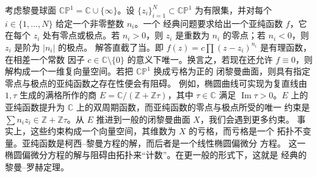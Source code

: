 \documentclass[11pt]{amsart}
\theoremstyle{definition}
\theoremstyle{remark}
\theoremstyle{plain}
\numberwithin{equation}{section}
\renewcommand{\:}{\colon}
\newcommand{\CC}{{\mathbb C}}
\newcommand{\CP}{{\mathbb C\mathbb P}}
\newcommand{\ZZ}{{\mathbb Z}}
\DeclareMathOperator{\coker}{coker}
\newcommand{\dbar}{{\overline\partial}}
\DeclareMathOperator{\Imm}{Im}
\newcommand{\sL}{\mathcal{L}}
\newcommand{\sO}{\mathcal{O}}
\newcommand{\sect}[1]{\sL(#1)}
\renewcommand{\Im}{\Imm}
\begin{document}
考虑黎曼球面 $\CP^1=\CC\cup\{\infty \}$。设 $\{z_i\}_{i=1}^N\subset \CP^1$
为有限集，并对每个 $i\in \{1,\dots ,N\}$ 给定一个非零整数 $n_i$。一个
经典问题要求给出一个亚纯函数 $f$，它在每个 $z_i$ 处有零点或极点。若
$n_i>0$，则 $z_i$ 是重数为 $n_i$ 的零点；若 $n_i<0$，则 $z_i$ 是阶为
$|n_i|$ 的极点。
解答直截了当。即 $f(z)=c\prod(z-z_i)^{n_i}$ 是有理函数，在相差一个常数
因子 $c\in \CC\setminus \{0\}$ 的意义下唯一。换言之，若现在还允许
$f\equiv 0$，则解构成一个一维复向量空间。若把 $\CP^1$ 换成亏格为正的
闭黎曼曲面，则具有指定零点与极点的亚纯函数之存在性便会有阻碍。
例如，椭圆曲线可实现为复直线由 $1,\tau $ 生成的满格所作的商
$E=\CC/(\ZZ+\ZZ\tau )$，其中 $\tau \in \CC$ 满足 $\Im\tau >0$。$E$ 上的
亚纯函数提升为 $\CC$ 上的双周期函数，而亚纯函数的零点与极点所受的唯一
约束是 $\sum n_iz_i\in \ZZ+\ZZ\tau $。从 $E$ 推进到一般的闭黎曼曲面
$X$，我们会遇到更多约束。
事实上，这些约束构成一个向量空间，其维数为 $X$ 的亏格，而亏格是一个
拓扑不变量。亚纯函数是柯西–黎曼方程的解，而后者是一个线性椭圆偏微分
方程。
这一椭圆偏微分方程的解与阻碍由拓扑来“计数”。在更一般的形式下，这就是
经典的黎曼–罗赫定理。
\end{document}
